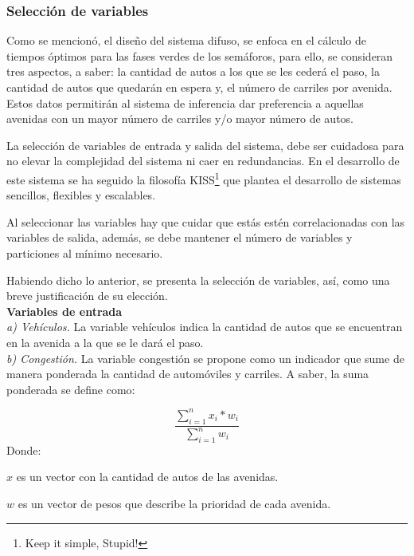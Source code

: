 \subsubsection{Selección de variables}
Como se mencionó, el diseño del sistema difuso, se enfoca en el cálculo de tiempos óptimos para las fases verdes de los semáforos, para ello, se consideran tres aspectos, a saber: la cantidad de autos a los que se les cederá el paso, la cantidad de autos que quedarán en espera y, el número de carriles por avenida. Estos datos permitirán al sistema de inferencia dar preferencia a aquellas avenidas con un mayor número de carriles y/o mayor número de autos.

La selección de variables de entrada y salida del sistema, debe ser cuidadosa para no elevar la complejidad del sistema ni caer en redundancias. En el desarrollo de este sistema se ha seguido la filosofía KISS\footnote{Keep it simple, Stupid!} que plantea el desarrollo de sistemas sencillos, flexibles y escalables.

Al seleccionar las variables hay que cuidar que estás estén correlacionadas con las variables de salida, además, se debe mantener el número de variables y particiones al mínimo necesario.

Habiendo dicho lo anterior, se presenta la selección de variables, así, como una breve justificación de su elección. \\

\textbf{Variables de entrada}\\
\textit{a) Vehículos.} La variable vehículos indica la cantidad de autos que se encuentran en la avenida a la que se le dará el paso.\\
\textit{b) Congestión.} La variable congestión se propone como un indicador que sume de manera ponderada la cantidad de automóviles y carriles. A saber, la suma ponderada se define como:

\begin{displaymath}
\frac{\sum_{i=1}^{n} x_i * w_i}{\sum_{i=1}^{n} w_i}
\end{displaymath}
Donde:

{\setlength{\baselineskip}{0.7\baselineskip}\begin{description}
	\item $x$ es un vector con la cantidad de autos de las avenidas.
	\item $w$ es un vector de pesos que describe la prioridad de cada avenida.
\end{description}}

